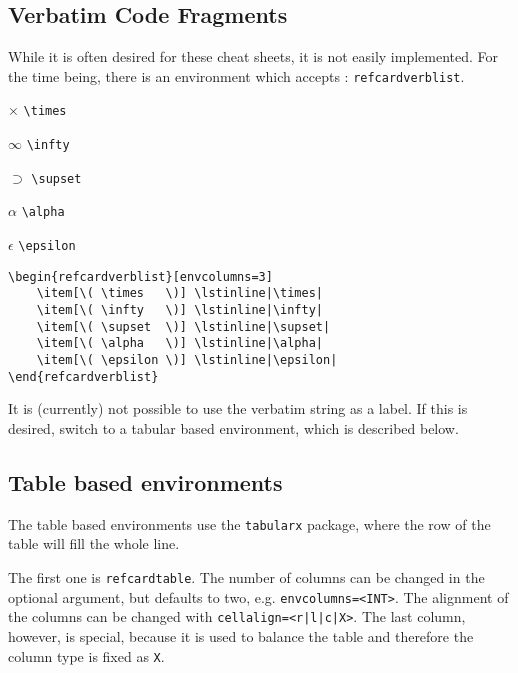 \documentclass[   %
  final,          %
  a4paper,        %
  columns=3,       %
  margin=1.0cm,   %
]{refcard}
\begin{document}
\subsection{Verbatim Code Fragments}

While it is often desired for these cheat sheets, it is not easily implemented.
For the time being, there is an environment which accepts : 
\lstinline`refcardverblist`.

\begin{refcardverblist}[envcolumns=3]
    \item[\( \times   \)] \lstinline|\times| 
    \item[\( \infty   \)] \lstinline|\infty| 
    \item[\( \supset  \)] \lstinline|\supset|
    \item[\( \alpha   \)] \lstinline|\alpha| 
    \item[\( \epsilon \)] \lstinline|\epsilon|
\end{refcardverblist}

\begin{lstlisting}
\begin{refcardverblist}[envcolumns=3]
    \item[\( \times   \)] \lstinline|\times| 
    \item[\( \infty   \)] \lstinline|\infty| 
    \item[\( \supset  \)] \lstinline|\supset|
    \item[\( \alpha   \)] \lstinline|\alpha| 
    \item[\( \epsilon \)] \lstinline|\epsilon|
\end{refcardverblist}
\end{lstlisting}

It is (currently) not possible to use  the verbatim string as a label.
If this is desired, switch to a tabular based environment, which is described below.

\subsection{Table based environments}

The table based environments use the \lstinline`tabularx` package,
where the row of the table will fill the whole line.

The first one is \lstinline`refcardtable`.
The number of columns can be changed in the optional argument, but defaults to two, 
e.g. \lstinline`envcolumns=<INT>`. The alignment of the columns can be changed
with \lstinline`cellalign=<r|l|c|X>`.
The last column, however, is special, because it is used to balance the table and 
therefore the column type is fixed as \lstinline`X`.
\end{document}
